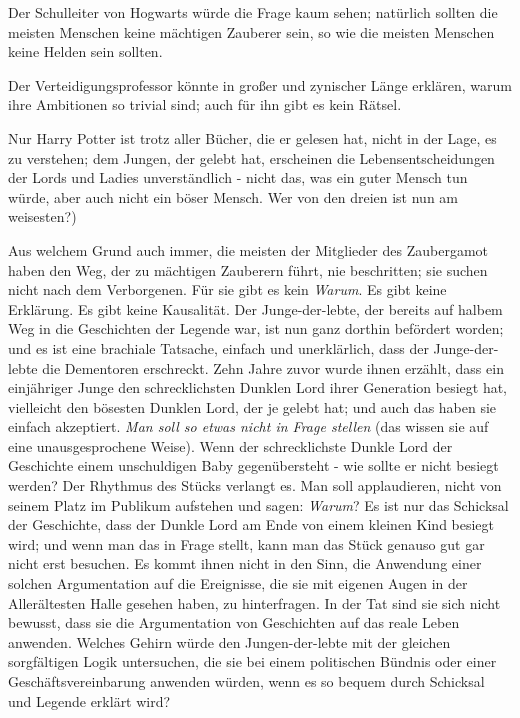 Der Schulleiter von Hogwarts würde die Frage kaum sehen; natürlich sollten die
meisten Menschen keine mächtigen Zauberer sein, so wie die meisten Menschen
keine Helden sein sollten.

Der Verteidigungsprofessor könnte in großer und zynischer Länge erklären, warum
ihre Ambitionen so trivial sind; auch für ihn gibt es kein Rätsel.

Nur Harry Potter ist trotz aller Bücher, die er gelesen hat, nicht in der Lage,
es zu verstehen; dem Jungen, der gelebt hat, erscheinen die Lebensentscheidungen
der Lords und Ladies unverständlich - nicht das, was ein guter Mensch tun würde,
aber auch nicht ein böser Mensch. Wer von den dreien ist nun am weisesten?)

Aus welchem Grund auch immer, die meisten der Mitglieder des Zaubergamot haben
den Weg, der zu mächtigen Zauberern führt, nie beschritten; sie suchen nicht
nach dem Verborgenen. Für sie gibt es kein \emph{Warum}. Es gibt keine
Erklärung. Es gibt keine Kausalität. Der Junge-der-lebte, der bereits auf halbem
Weg in die Geschichten der Legende war, ist nun ganz dorthin befördert worden;
und es ist eine brachiale Tatsache, einfach und unerklärlich, dass der
Junge-der-lebte die Dementoren erschreckt. Zehn Jahre zuvor wurde ihnen erzählt,
dass ein einjähriger Junge den schrecklichsten Dunklen Lord ihrer Generation
besiegt hat, vielleicht den bösesten Dunklen Lord, der je gelebt hat; und auch
das haben sie einfach akzeptiert. \emph{Man soll so etwas nicht in Frage
stellen} (das wissen sie auf eine unausgesprochene Weise). Wenn der
schrecklichste Dunkle Lord der Geschichte einem unschuldigen Baby gegenübersteht
- wie sollte er nicht besiegt werden? Der Rhythmus des Stücks verlangt es. Man
soll applaudieren, nicht von seinem Platz im Publikum aufstehen und sagen: \glqq{}
\emph{Warum}?\grqq{} Es ist nur das Schicksal der Geschichte, dass der Dunkle
Lord am Ende von einem kleinen Kind besiegt wird; und wenn man das in Frage
stellt, kann man das Stück genauso gut gar nicht erst besuchen. Es kommt ihnen
nicht in den Sinn, die Anwendung einer solchen Argumentation auf die Ereignisse,
die sie mit eigenen Augen in der Allerältesten Halle gesehen haben, zu
hinterfragen. In der Tat sind sie sich nicht bewusst, dass sie die Argumentation
von Geschichten auf das reale Leben anwenden. Welches Gehirn würde den
Jungen-der-lebte mit der gleichen sorgfältigen Logik untersuchen, die sie bei
einem politischen Bündnis oder einer Geschäftsvereinbarung anwenden würden, wenn
es so bequem durch Schicksal und Legende erklärt wird?

